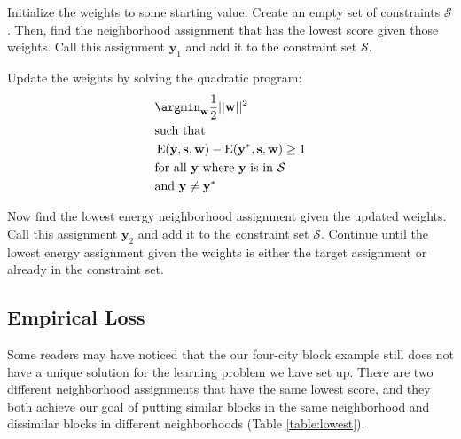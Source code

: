 Initialize the weights to some starting value. Create an empty set of
constraints $\mathcal{S}$. Then, find the neighborhood assignment that
has the lowest score given those weights. Call this assignment
$\mathbf{y}_1$ and add it to the constraint set $\mathcal{S}$.

Update the weights by solving the quadratic program: 
%
\begin{align*}
&\argmin_{\mathbf{w}} \frac{1}{2}||\mathbf{w}||^2 \\
&\text{such that} \\
&\operatorname{E}(\mathbf{y}, \mathbf{s}, \mathbf{w})
- \operatorname{E}(\mathbf{y}^*, \mathbf{s}, \mathbf{w}) \geq 1 \\ 
&\text{for all } \mathbf{y} \text{ where } \mathbf{y} \text{ is in } \mathcal{S}\\
&\text{and } \mathbf{y} \neq \mathbf{y}^*
\end{align*}
%

Now find the lowest energy neighborhood assignment given the updated
weights. Call this assignment $\mathbf{y}_2$ and add it to the
constraint set $\mathcal{S}$. Continue until the lowest energy
assignment given the weights is either the target assignment or
already in the constraint set.\cite{szummer_learning_2008}


\subsection*{Empirical Loss}
Some readers may have noticed that the our four-city block example
still does not have a unique solution for the learning problem we have
set up. There are two different neighborhood assignments that have the
same lowest score, and they both achieve our goal of putting similar
blocks in the same neighborhood and dissimilar blocks in different
neighborhoods (Table \ref{table:lowest}).

